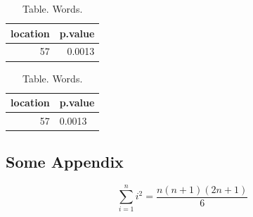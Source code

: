 \documentclass{article}
\begin{document}
\begin{table}[ht]
\centering
\caption{Table. Words.} \label{tab:one}
\begin{tabular}{rr}
 \hline
location & p.value \\ 
 \hline
57 & 0.0013 \\ 
  \hline
\end{tabular}
\end{table}


\begin{table}[ht]
\centering
\caption{Table. Words.}
\begin{tabular}{rC{5cm}}
 \hline
location & p.value \\ 
 \hline
{} 57 & 0.0013  \\ 
  \hline
\end{tabular}
\end{table}

\clearpage

\begin{appendices}

\section{Some Appendix}

$$
\sum_{i=1}^n i^2 
= 
\frac{
n (n+1) (2n+1)
}{
6
}
$$

\end{appendices}



 
\end{document}
